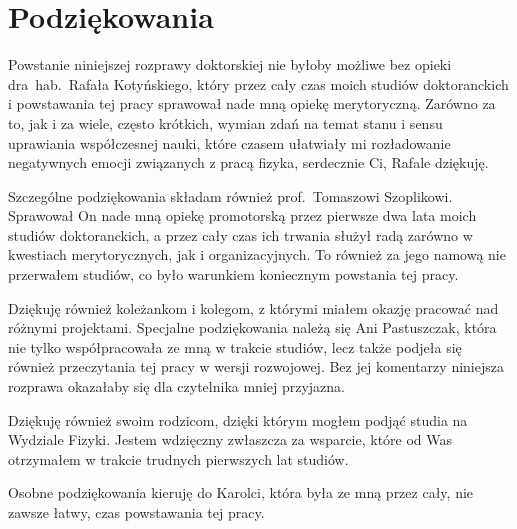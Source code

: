 \documentclass[pdflatex,11pt]{aghdpl}
\author{Marcin Stolarek}
\date{2016}
\begin{document}
\frontmatter

\titlepages

\section*{Podziękowania}
Powstanie niniejszej rozprawy doktorskiej nie byłoby możliwe bez opieki dra~hab.~Rafała Kotyńskiego, który przez cały czas moich studiów doktoranckich i powstawania tej pracy sprawował nade mną opiekę merytoryczną. Zarówno za to, jak i za wiele, często krótkich, wymian zdań na temat stanu i sensu uprawiania współczesnej nauki, które czasem ułatwiały mi rozładowanie negatywnych emocji związanych z pracą fizyka, serdecznie Ci, Rafale dziękuję.

Szczególne podziękowania składam również prof.~Tomaszowi Szoplikowi. Sprawował On nade mną opiekę promotorską przez pierwsze dwa lata moich studiów doktoranckich, a przez cały czas ich trwania służył radą zarówno w kwestiach merytorycznych, jak i organizacyjnych. To również za jego namową nie przerwałem studiów, co było warunkiem koniecznym powstania tej pracy.

Dziękuję również koleżankom i kolegom, z którymi miałem okazję pracować nad różnymi projektami. Specjalne podziękowania należą się Ani Pastuszczak, która nie tylko współpracowała ze mną w trakcie studiów, lecz także podjeła się również przeczytania tej pracy w wersji rozwojowej. Bez jej komentarzy niniejsza rozprawa okazałaby się dla czytelnika mniej przyjazna.

Dziękuję również swoim rodzicom, dzięki którym mogłem podjąć studia na Wydziale Fizyki. Jestem wdzięczny zwłaszcza za wsparcie, które od Was otrzymałem w trakcie trudnych pierwszych lat studiów.  

Osobne podziękowania kieruję do Karolci, która była ze mną przez cały, nie zawsze łatwy, czas powstawania tej pracy.
\clearpage

\tableofcontents
\clearpage

\mainmatter


















\printnomenclature

%



\listoffigures
{}

\end{document}
